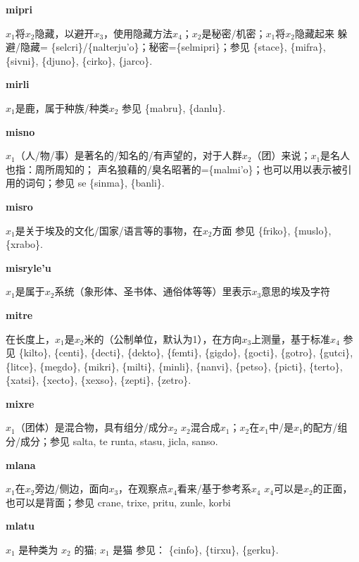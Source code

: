 \documentclass[notitlepage,twocolumn,a4paper,10pt]{book}
\begin{document}
{\sffamily\bfseries mipri}\enspace {\ttfamily\bfseries[mip]}  $x_1$将$x_2$隐藏，以避开$x_3$，使用隐藏方法$x_4$；$x_2$是秘密\slash{}机密；$x_1$将$x_2$隐藏起来 \textemdash{} 躲避\slash{}隐藏= \{selcri\}\slash{}\{nalterju'o\}；秘密=\{selmipri\}；参见 \{stace\}, \{mifra\}, \{sivni\}, \{djuno\}, \{cirko\}, \{jarco\}.

{\sffamily\bfseries mirli} $x_1$是鹿，属于种族\slash{}种类$x_2$ \textemdash{} 参见 \{mabru\}, \{danlu\}.

{\sffamily\bfseries misno}\enspace {\ttfamily\bfseries[mis     mi'o]}  $x_1$（人\slash{}物\slash{}事）是著名的\slash{}知名的\slash{}有声望的，对于人群$x_2$（团）来说；$x_1$是名人 \textemdash{} 也指：周所周知的； 声名狼藉的\slash{}臭名昭著的=\{malmi'o\}；也可以用以表示被引用的词句；参见 se \{sinma\}, \{banli\}.

{\sffamily\bfseries misro} $x_1$是关于埃及的文化\slash{}国家\slash{}语言等的事物，在$x_2$方面 \textemdash{} 参见 \{friko\}, \{muslo\}, \{xrabo\}.

{\sffamily\bfseries misryle'u} $x_1$是属于$x_2$系统（象形体、圣书体、通俗体等等）里表示$x_3$意思的埃及字符

{\sffamily\bfseries mitre}\enspace {\ttfamily\bfseries[    tre]}  在长度上，$x_1$是$x_2$米的（公制单位，默认为1），在方向$x_3$上测量，基于标准$x_4$ \textemdash{} 参见 \{kilto\}, \{centi\}, \{decti\}, \{dekto\}, \{femti\}, \{gigdo\}, \{gocti\}, \{gotro\}, \{gutci\}, \{litce\}, \{megdo\}, \{mikri\}, \{milti\}, \{minli\}, \{nanvi\}, \{petso\}, \{picti\}, \{terto\}, \{xatsi\}, \{xecto\}, \{xexso\}, \{zepti\}, \{zetro\}.

{\sffamily\bfseries mixre}  $x_1$（团体）是混合物，具有组分\slash{}成分$x_2$ \textemdash{} $x_2$混合成$x_1$；$x_2$在$x_1$中\slash{}是$x_1$的配方\slash{}组分\slash{}成分；参见 {salta}, te {runta}, {stasu}, {jicla}, {sanso}.

{\sffamily\bfseries mlana}\enspace {\ttfamily\bfseries[    mla]}  $x_1$在$x_2$旁边\slash{}侧边，面向$x_3$，在观察点$x_4$看来\slash{}基于参考系$x_4$ \textemdash{} $x_4$可以是$x_2$的正面，也可以是背面；参见 {crane}, {trixe}, {pritu}, {zunle}, {korbi}

{\sffamily\bfseries mlatu}\enspace {\ttfamily\bfseries[lat]}  $x_{1}$ 是种类为 $x_{2}$ 的猫; $x_{1}$ 是猫 \textemdash{} 参见： \{cinfo\}, \{tirxu\}, \{gerku\}.
\end{document}
